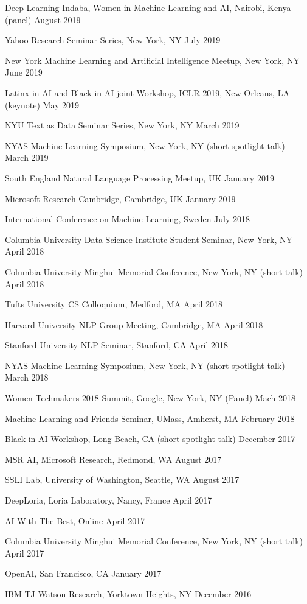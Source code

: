\documentclass[letterpaper,200pt]{article}
\renewenvironment{itemize}{
  \begin{list}{}{
    \setlength{\leftmargin}{1.5em}
  }
}{
  \end{list}
}
\begin{document}
\begin{itemize}
	\item Deep Learning Indaba, Women in Machine Learning and AI, Nairobi, Kenya  (panel) \hfill August 2019
	\item Yahoo Research Seminar Series, New York, NY \hfill July 2019
	\item New York Machine Learning and Artificial Intelligence Meetup, New York, NY \hfill June 2019
	\item Latinx in AI and Black in AI joint Workshop, ICLR 2019,  New Orleans, LA (keynote) \hfill May 2019
        \item NYU Text as Data Seminar Series, New York, NY \hfill March 2019
        \item NYAS Machine Learning Symposium, New York, NY (short spotlight talk) \hfill  March 2019
        \item South England Natural Language Processing Meetup, UK \hfill January 2019
        \item Microsoft Research Cambridge, Cambridge, UK \hfill January 2019
        \item International Conference on Machine Learning, Sweden \hfill July 2018
	\item Columbia University Data Science Institute Student Seminar, New York, NY  \hfill  April 2018
	\item Columbia University Minghui Memorial Conference, New York, NY (short talk) \hfill  April 2018
	\item Tufts University CS Colloquium, Medford, MA \hfill April 2018
	\item Harvard University NLP Group Meeting, Cambridge, MA \hfill April 2018
	\item Stanford University NLP Seminar, Stanford, CA \hfill April 2018
	\item NYAS Machine Learning Symposium, New York, NY (short spotlight talk) \hfill  March 2018
	\item Women Techmakers $2018$ Summit, Google, New York, NY (Panel) \hfill Mach 2018
 	\item Machine Learning and Friends Seminar, UMass, Amherst, MA  \hfill  February 2018
	\item Black in AI Workshop, Long Beach, CA (short spotlight talk) \hfill December 2017	
	\item MSR AI, Microsoft Research, Redmond, WA \hfill   August 2017
	\item SSLI Lab, University of Washington, Seattle, WA \hfill   August 2017
	\item DeepLoria, Loria Laboratory, Nancy, France  \hfill  April 2017
	\item AI With The Best, Online \hfill  April 2017
	\item Columbia University Minghui Memorial Conference, New York, NY (short talk) \hfill  April 2017
	\item OpenAI, San Francisco, CA   \hfill  January 2017
	\item IBM TJ Watson Research, Yorktown Heights, NY  \hfill  December 2016
\end{itemize}
\end{document}
